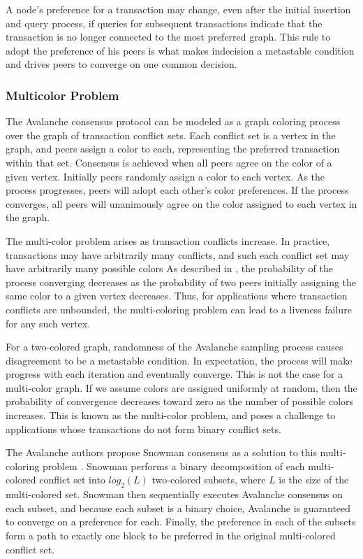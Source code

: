 \documentclass[12pt]{article}
\begin{document}
  A node's preference for a transaction may change, even after the initial
  insertion and query process, if queries for subsequent transactions indicate
  that the transaction is no longer connected to the most preferred graph. This
  rule to adopt the preference of his peers is what makes indecision a
  metastable condition and drives peers to converge on one common decision.

\subsubsection{Multicolor Problem}
  \label{sec:Multicolor Problem}
  The Avalanche consensus protocol can be modeled as a graph coloring process
  over the graph of transaction conflict sets. Each conflict set is a vertex in
  the graph, and peers assign a color to each, representing the preferred
  transaction within that set. Consensus is achieved when all peers agree on
  the color of a given vertex. Initially peers randomly assign a color to each
  vertex. As the process progresses, peers will adopt each other's color
  preferences. If the process converges, all peers will unanimously agree on
  the color assigned to each vertex in the graph.

  The multi-color problem arises as transaction conflicts increase. In
  practice, transactions may have arbitrarily many conflicts, and such each
  conflict set may have arbitrarily many possible colors As described in
  \cite{buchwald2024frosty}, the probability of the process converging
  decreases as the probability of two peers initially assigning the same color
  to a given vertex decreases. Thus, for applications where transaction
  conflicts are unbounded, the multi-coloring problem can lead to a liveness
  failure for any such vertex.

  For a two-colored graph, randomness of the Avalanche sampling process causes
  disagreement to be a metastable condition. In expectation, the process will
  make progress with each iteration and eventually converge. This is not the
  case for a multi-color graph. If we assume colors are assigned uniformly at
  random, then the probability of convergence decreases toward zero as the
  number of possible colors increases. This is known as the multi-color
  problem, and poses a challenge to applications whose transactions do not form
  binary conflict sets.

  The Avalanche authors propose Snowman consensus as a solution to this
  multi-coloring problem \cite{buchwald2024frosty}. Snowman performs a binary
  decomposition of each multi-colored conflict set into $log_2(L)$ two-colored
  subsets, where $L$ is the size of the multi-colored set. Snowman then
  sequentially executes Avalanche consensus on each subset, and because each
  subset is a binary choice, Avalanche is guaranteed to converge on a
  preference for each. Finally, the preference in each of the subsets form a
  path to exactly one block to be preferred in the original multi-colored
  conflict set.
\end{document}
